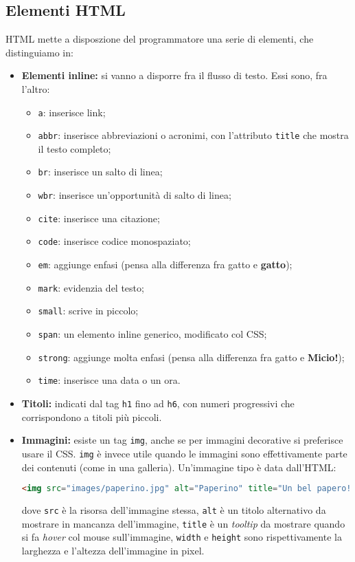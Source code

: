\documentclass[a4paper,11pt]{article}
\begin{document}
\subsection{Elementi HTML}
HTML mette a disposzione del programmatore una serie di elementi, che distinguiamo in:
\begin{itemize}
	\item \textbf{Elementi inline:} si vanno a disporre fra il flusso di testo.
		Essi sono, fra l'altro:
		\begin{itemize}
			\item \lstinline|a|: inserisce link;
			\item \lstinline|abbr|: inserisce abbreviazioni o acronimi, con l'attributo \texttt{title} che mostra il testo completo;
			\item \lstinline|br|: inserisce un salto di linea;
			\item \lstinline|wbr|: inserisce un'opportunità di salto di linea;
			\item \lstinline|cite|: inserisce una citazione;
			\item \lstinline|code|: inserisce codice monospaziato;
			\item \lstinline|em|: aggiunge enfasi (pensa alla differenza fra gatto e \textbf{gatto});
			\item \lstinline|mark|: evidenzia del testo;
			\item \lstinline|small|: scrive in piccolo;
			\item \lstinline|span|: un elemento inline generico, modificato col CSS;
			\item \lstinline|strong|: aggiunge molta enfasi (pensa alla differenza fra gatto e \large{\textbf{Micio!}});
			\item \lstinline|time|: inserisce una data o un ora.
		\end{itemize}
	\item \textbf{Titoli:} indicati dal tag \lstinline|h1| fino ad \lstinline|h6|, con numeri progressivi che corrispondono a titoli più piccoli.
	\item \textbf{Immagini:} esiste un tag \lstinline|img|, anche se per immagini decorative si preferisce usare il CSS.
\lstinline|img| è invece utile quando le immagini sono effettivamente parte dei contenuti (come in una galleria).
Un'immagine tipo è data dall'HTML:
\begin{lstlisting}[language=html, style=codestyle]	
<img src="images/paperino.jpg" alt="Paperino" title="Un bel papero!" width="80" height="40" />
\end{lstlisting}
dove \lstinline|src| è la risorsa dell'immagine stessa, \lstinline|alt| è un titolo alternativo da mostrare in mancanza dell'immagine, \lstinline|title| è un \textit{tooltip} da mostrare quando si fa \textit{hover} col mouse sull'immagine, \lstinline|width| e \lstinline|height| sono rispettivamente la larghezza e l'altezza dell'immagine in pixel.


\end{itemize}
\end{document}
